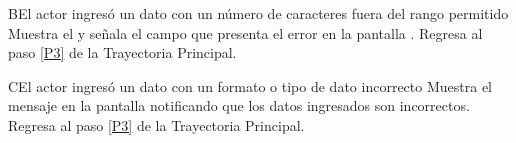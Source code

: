 		\begin{UCtrayectoriaA}{B}{El actor ingresó un dato con un número de caracteres fuera del rango permitido}
	\UCpaso[\UCsist] Muestra el  y señala el campo que presenta el error en la pantalla .
	\UCpaso[\UCactor] Regresa al paso \ref{P3} de la Trayectoria Principal.
\end{UCtrayectoriaA}




		\begin{UCtrayectoriaA}{C}{El actor ingresó un dato con un formato o tipo de dato incorrecto}
	\UCpaso[\UCsist] Muestra el mensaje  en la pantalla  notificando que los datos ingresados son incorrectos.
	\UCpaso[\UCactor] Regresa al paso \ref{P3} de la Trayectoria Principal.
\end{UCtrayectoriaA}